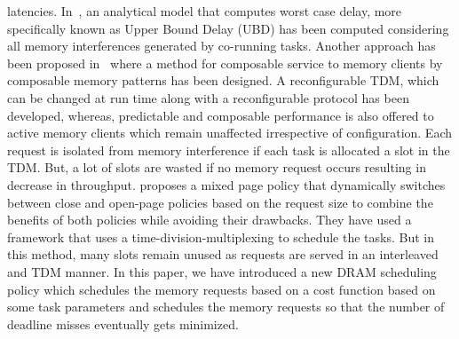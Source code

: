 latencies. 
In~\cite{paolieri2013timing}, an analytical model that computes worst case delay, more specifically known as Upper Bound 
Delay (UBD) has been computed considering all memory interferences generated by co-running tasks. Another approach has been 
proposed in~\cite{Goossens13CODES} where a method for composable service to memory clients by composable memory 
patterns has been designed. 
A reconfigurable TDM, which can be changed at run time along with a reconfigurable protocol has 
been developed, whereas, predictable and composable performance is also offered to active memory clients which remain 
unaffected irrespective of configuration. Each request is isolated from memory interference if each task is allocated 
a slot in the TDM. But, a lot of slots are wasted if no memory request occurs resulting in decrease in throughput. 
\cite{hassan2017predictable} proposes a mixed page policy that dynamically switches between close and open-page policies based 
on the request size to combine the benefits of both policies while avoiding their drawbacks. They have used a framework 
that uses a time-division-multiplexing to schedule the tasks.
But in this method, many slots remain unused as requests are served in an interleaved and TDM manner. 
In this paper, we have introduced a new DRAM scheduling policy which schedules the memory requests based on a cost function
based on some task parameters and schedules the memory requests so that the number of deadline misses eventually gets minimized.
